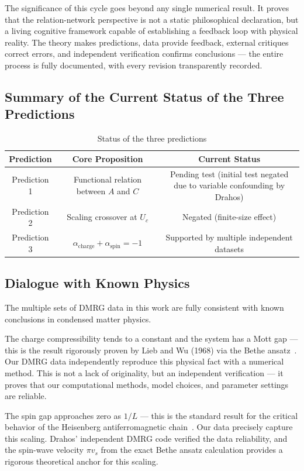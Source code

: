 \documentclass[prb,reprint,twocolumn,superscriptaddress]{revtex4-2}
\begin{document}
The significance of this cycle goes beyond any single numerical result. It proves that the relation-network perspective is not a static philosophical declaration, but a living cognitive framework capable of establishing a feedback loop with physical reality. The theory makes predictions, data provide feedback, external critiques correct errors, and independent verification confirms conclusions --- the entire process is fully documented, with every revision transparently recorded.

\subsection{Summary of the Current Status of the Three Predictions}

\begin{table}[htbp]
\caption{Status of the three predictions}
\label{tab:pred_status}
\begin{tabular}{ccc}
\toprule
Prediction & Core Proposition & Current Status \\
\midrule
Prediction 1 & Functional relation between $A$ and $C$ & Pending test (initial test negated due to variable confounding by Drahos) \\
Prediction 2 & Scaling crossover at $U_c$ & Negated (finite-size effect) \\
Prediction 3 & $\alpha_{\mathrm{charge}} + \alpha_{\mathrm{spin}} = -1$ & Supported by multiple independent datasets \\
\bottomrule
\end{tabular}
\end{table}

\subsection{Dialogue with Known Physics}

The multiple sets of DMRG data in this work are fully consistent with known conclusions in condensed matter physics.

The charge compressibility tends to a constant and the system has a Mott gap --- this is the result rigorously proven by Lieb and Wu (1968) via the Bethe ansatz~\cite{Lieb1968}. Our DMRG data independently reproduce this physical fact with a numerical method. This is not a lack of originality, but an independent verification --- it proves that our computational methods, model choices, and parameter settings are reliable.

The spin gap approaches zero as $1/L$ --- this is the standard result for the critical behavior of the Heisenberg antiferromagnetic chain~\cite{Affleck1989,Giamarchi2004,Schulz1990}. Our data precisely capture this scaling. Drahos' independent DMRG code verified the data reliability, and the spin-wave velocity $\pi v_s$ from the exact Bethe ansatz calculation provides a rigorous theoretical anchor for this scaling.
\end{document}
